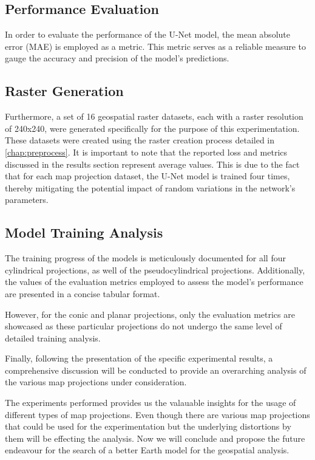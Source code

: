\subsection{Performance Evaluation}
In order to evaluate the performance of the U-Net model, the mean absolute error (MAE) is employed as a metric. This metric serves as a reliable measure to gauge
the accuracy and precision of the model's predictions.
\subsection{Raster Generation}
Furthermore, a set of 16 geospatial raster datasets, each with a raster resolution of 240x240, were generated specifically for the purpose of this experimentation.
These datasets were created using the raster creation process detailed in \autoref{chap:preprocess}. It is important to note that the reported loss and metrics discussed
in the results section represent average values. This is due to the fact that for each map projection dataset, the U-Net model is trained four times, thereby mitigating
the potential impact of random variations in the network's parameters.
\subsection{Model Training Analysis}
The training progress of the models is meticulously documented for all four cylindrical projections, as well of the pseudocylindrical projections.
Additionally, the values of the evaluation metrics employed to assess the model's performance are presented in a concise tabular format.

However, for the conic and planar projections, only the evaluation metrics are showcased as these particular projections do not undergo the same level of detailed training
analysis.

Finally, following the presentation of the specific experimental results, a comprehensive discussion will be conducted to provide an overarching analysis of the
various map projections under consideration.

\clearpage

\clearpage

\clearpage


\clearpage



The experiments performed provides us the valauable insights for the usage of different types of map projections. Even though there are various map projections that could be used for the experimentation but the underlying
distortions by them will be effecting the analysis. Now we will conclude and propose the future endeavour for the search of a better Earth model for the geospatial analysis.
